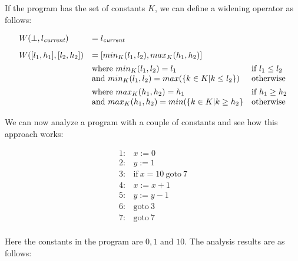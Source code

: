 \documentclass[11pt]{article}
\begin{document}
If the program has the set of constants $K$, we can define a widening operator as follows:

\[
\begin{array}{lll}

W(\bot,l_\textit{current}) & = l_\textit{current} \\[2ex]
W([l_1,h_1],[l_2,h_2]) & = [min_K(l_1, l_2), max_K(h_1, h_2)] \\[1ex]
& \mbox{where}~ min_K(l_1, l_2) = l_1 & \mbox{if}~ l_1 \le l_2 \\
& \mbox{and}~ min_K(l_1, l_2) = max(\{k \in K | k \le l_2\}) & \mbox{otherwise} \\[1ex]
& \mbox{where}~ max_K(h_1, h_2) = h_1 & \mbox{if}~ h_1 \ge h_2 \\
& \mbox{and}~ max_K(h_1, h_2) = min(\{k \in K | k \ge h_2\} & \mbox{otherwise} \\

\end{array}
\]

We can now analyze a program with a couple of constants and see how this approach works:

\[
\begin{array}{ll}
1: & x := 0\\
2: & y := 1\\
3: & \mbox{if}~x=10~\mbox{goto}~7\\
4: & x := x + 1\\
5: & y := y - 1\\
6: & \mbox{goto}~3\\
7: & \mbox{goto}~7\\
\end{array}
\]

Here the constants in the program are $0,1$ and $10$.  The analysis results are
as follows:
\end{document}
